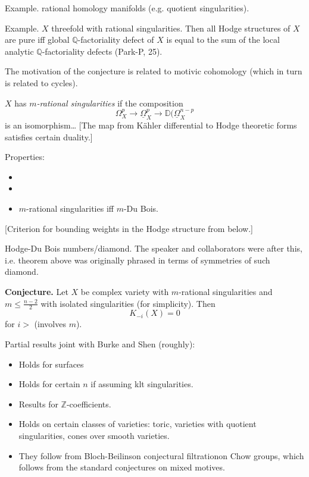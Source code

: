 \noindent
Example. rational homology manifolds (e.g.
quotient singularities).

\noindent
Example. $X$ threefold with rational
singularities. Then all Hodge structures of
$X$ are pure iff global
$\mathbb{Q}$-factoriality defect of $X$ is
equal to the sum of the local analytic
$\mathbb{Q}$-factoriality defects (Park-P,
25).

\begin{remark}
\label{remark-motivic-conjecture}
The motivation of the conjecture is related
to motivic cohomology (which in turn is
related to cycles).
\end{remark}

\begin{definition}[Technical]
\label{definition-technical}
$X$ has {\it $m$-rational singularities}
if the composition 
$$
\Omega_X^p \to \underline{\Omega}_X^p
\to \mathbb{D}(\underline{\Omega}_X^{n-p}
$$
is an isomorphism…
[The map from Kähler differential to Hodge
theoretic forms satisfies certain duality.]
\end{definition}

\noindent
Properties:
\begin{itemize}
\item 
\item 

\item $m$-rational singularities iff
$m$-Du Bois.
 \end{itemize}

\begin{theorem}[Park-P. '24]
\label{theorem-pp24}
[Criterion for bounding weights in the Hodge
structure from below.]
\end{theorem}

\noindent
Hodge-Du Bois numbers/diamond. The speaker
and collaborators were after this, i.e.
theorem above was originally phrased in
terms of symmetries of such diamond.

\noindent
{\bf Conjecture.} Let $X$ be complex variety
with $m$-rational singularities and $m \leq
\frac{n-2}{2}$ with isolated singularities
(for simplicity).
Then 
$$
K_{-i}(X) =0 
$$
for $i>$ (involves $m$).

\medskip\noindent
Partial results joint with Burke and Shen 
(roughly):

\begin{itemize}
\item Holds for surfaces
\item Holds for certain $n$ if assuming
klt singularities.
\item Results for $\mathbb{Z}$-coefficients.
\item Holds on certain classes of varieties:
toric, varieties with quotient
singularities, cones over smooth varieties.
\item They follow from Bloch-Beilinson
conjectural filtrationon Chow groups, which
follows from the standard conjectures on
mixed motives.
\end{itemize}

